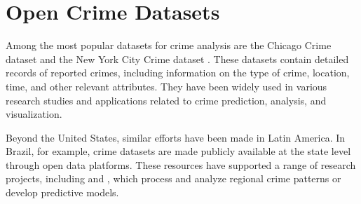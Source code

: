 





\section{Open Crime Datasets}

Among the most popular datasets for crime analysis are the Chicago Crime dataset \cite{ChicagoDataset} and the New York City Crime dataset \cite{NYCDataset}. These datasets contain detailed records of reported crimes, including information on the type of crime, location, time, and other relevant attributes. They have been widely used in various research studies and applications related to crime prediction, analysis, and visualization.

Beyond the United States, similar efforts have been made in Latin America. In Brazil, for example, crime datasets are made publicly available at the state level through open data platforms. These resources have supported a range of research projects, including \cite{Garcia2022CriPAV} and \cite{Waqar2025CrimePredictionGNN}, which process and analyze regional crime patterns or develop predictive models.

